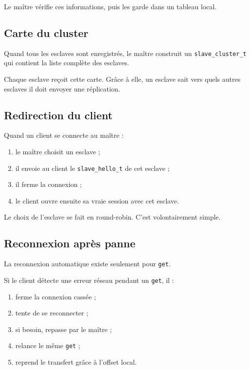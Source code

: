 \documentclass[a4paper,11pt]{article}
\begin{document}
Le maître vérifie ces informations, puis les garde dans un tableau local.

\subsection{Carte du cluster}

Quand tous les esclaves sont enregistrés, le maître construit un
\texttt{slave\_cluster\_t} qui contient la liste complète des esclaves.

Chaque esclave reçoit cette carte. Grâce à elle, un esclave sait vers quels
autres esclaves il doit envoyer une réplication.

\subsection{Redirection du client}

Quand un client se connecte au maître :

\begin{enumerate}[leftmargin=*]
    \item le maître choisit un esclave ;
    \item il envoie au client le \texttt{slave\_hello\_t} de cet esclave ;
    \item il ferme la connexion ;
    \item le client ouvre ensuite sa vraie session avec cet esclave.
\end{enumerate}

Le choix de l'esclave se fait en round-robin. C'est volontairement simple.

\subsection{Reconnexion après panne}

La reconnexion automatique existe seulement pour \texttt{get}.

Si le client détecte une erreur réseau pendant un \texttt{get}, il :

\begin{enumerate}[leftmargin=*]
    \item ferme la connexion cassée ;
    \item tente de se reconnecter ;
    \item si besoin, repasse par le maître ;
    \item relance le même \texttt{get} ;
    \item reprend le transfert grâce à l'offset local.
\end{enumerate}
\end{document}
